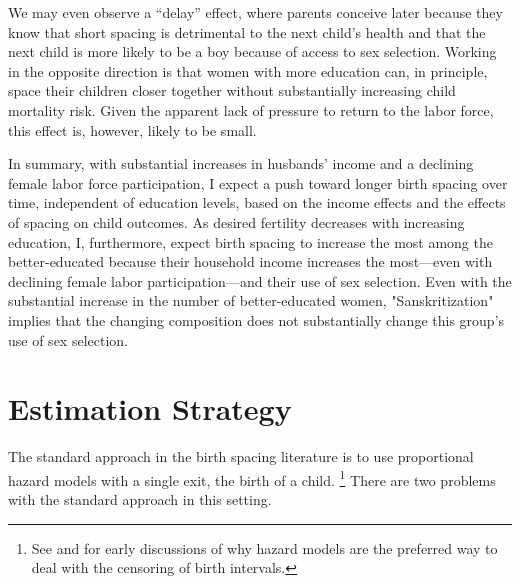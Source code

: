 \documentclass[12pt,letterpaper]{article}
\begin{document}
We may even observe a ``delay'' effect, where parents conceive later because they know 
that short spacing is detrimental to the next child's health and that the next child is 
more likely to be a boy because of access to sex selection.
Working in the opposite direction is that women with more education can, in principle, 
space their children closer together without substantially increasing child mortality 
risk.
Given the apparent lack of pressure to return to the labor force,
this effect is, however, likely to be small.

In summary, with substantial increases in husbands' income and a declining female labor 
force participation, I expect a push toward longer birth spacing over time, independent
of education levels, based on the income effects and the effects of spacing
on child outcomes.
As desired fertility decreases with increasing education, I, furthermore, expect 
birth spacing to increase the most among the better-educated because their household
income increases the most---even with declining female labor participation---and 
their use of sex selection.
Even with the substantial increase in the number of better-educated women, 
"Sanskritization" implies that the changing composition does not substantially change 
this group's use of sex selection.




\section{Estimation Strategy\label{sec:strategy}}


The standard approach in the birth spacing literature is to use proportional hazard
models with a single exit, the birth of a child.%
\footnote{
See \citet{Sheps1970} and \citet{Newman1984} for early discussions of why 
hazard models are the preferred way to deal with the censoring of birth
intervals.
}
There are two problems with the standard approach in this setting.
\end{document}
